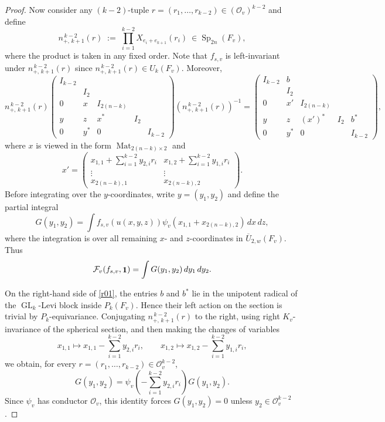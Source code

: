 \documentclass[11pt,notitlepage]{amsart}
\theoremstyle{definition}
\theoremstyle{remark}
\newcommand{\calF}{\mathcal{F}}
\newcommand{\calO}{\mathcal{O}}
\newcommand{\nPlusKone}{n_{+,\,k+1}^{\,k-2}}
\DeclareMathOperator{\id}{{\bf 1}}
\DeclareMathOperator{\GL}{GL}
\DeclareMathOperator{\Sp}{Sp}
\DeclareMathOperator{\Mat}{Mat}
\begin{document}
\begin{proof}
Now consider any $(k-2)$-tuple $r=(r_1,\dots,r_{k-2})\in (\calO_v)^{k-2}$ and define
\begin{equation}\label{def:npluskone-rootonly}
  \nPlusKone(r)
  \;:=\;
  \prod_{i=1}^{k-2} X_{e_i+e_{k+1}}(r_i)\ \in \Sp_{2n}(F_v),
\end{equation}
where the product is taken in any fixed order.
Note that $f_{s,v}$ is left-invariant under $\nPlusKone(r)$ since $\nPlusKone(r)\in U_k(F_v)$. Moreover,
\begin{equation}\label{r01}
  \nPlusKone(r)\begin{pmatrix} 
    I_{k-2}&&&&\\
    &I_2&&&\\
    0&x&I_{2(n-k)}&&\\
    y&z&x^\ast&I_2&\\
    0&y^\ast&0&&I_{k-2}\end{pmatrix}(\nPlusKone(r))^{-1} = \begin{pmatrix} 
    I_{k-2}&b&&&\\
    &I_2&&&\\
    0&x'&I_{2(n-k)}&&\\
    y&z&(x')^\ast&I_2&b^\ast\\
    0&y^\ast&0&&I_{k-2}\end{pmatrix},
\end{equation}
where $x$ is viewed in the form $\Mat_{2(n-k)\times 2}$ and
\begin{equation}
  x' = \begin{pmatrix}
    x_{1,1}+\sum_{i=1}^{k-2}y_{2,i}r_i&x_{1,2} +\sum_{i=1}^{k-2} y_{1,i}r_i\\
    \vdots&\vdots\\
    x_{2(n-k),1}&x_{2(n-k),2}
  \end{pmatrix}.
\end{equation}
Before integrating over the \(y\)-coordinates, write \(y=(y_1,y_2)\) and define
the partial integral
\[
G(y_1,y_2)
=
\int f_{s,v}(u(x,y,z))
 \psi_v(x_{1,1}+x_{2(n-k),2})\,dx\,dz ,
\]
where the integration is over all remaining \(x\)- and \(z\)-coordinates in
\(\overline U_{2,w}(F_v)\). Thus
\[
\calF_v(f_{s,v},\id)=\int G(y_1,y_2)\,dy_1\,dy_2 .
\]

On the right-hand side of \eqref{r01}, the entries \(b\) and \(b^\ast\) lie in the
unipotent radical of the \(\GL_k\)-Levi block inside \(P_k(F_v)\). Hence their
left action on the section is trivial by \(P_k\)-equivariance. Conjugating
\(\nPlusKone(r)\) to the right, using right \(K_v\)-invariance of the spherical
section, and then making the changes of variables
\[
x_{1,1}\mapsto x_{1,1}-\sum_{i=1}^{k-2}y_{2,i}r_i,\qquad
x_{1,2}\mapsto x_{1,2}-\sum_{i=1}^{k-2}y_{1,i}r_i,
\]
we obtain, for every \(r=(r_1,\ldots,r_{k-2})\in\calO_v^{k-2}\),
\[
G(y_1,y_2)
=
\psi_v\!\left(-\sum_{i=1}^{k-2}y_{2,i}r_i\right)G(y_1,y_2).
\]
Since \(\psi_v\) has conductor \(\calO_v\), this identity forces
$G(y_1,y_2)=0 $ unless $y_2\in\calO_v^{k-2}$.


\end{proof}
\end{document}
